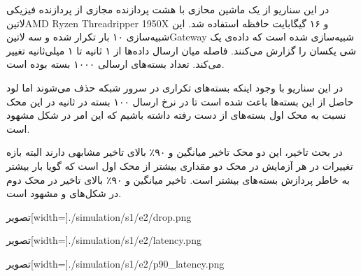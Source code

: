 در این سناریو از یک ماشین محازی با هشت پردازنده مجازی از پردازنده فیزیکی
‌لاتین{AMD Ryzen Threadripper 1950X}
و ۱۶ گیگابایت حافظه استفاده شد.
این شبیه‌سازی ۱۰ بار تکرار شده
و سه ‌لاتین{Gateway} شبیه‌سازی شده است که داده‌ی یک شی یکسان را گزارش می‌کنند. فاصله میان ارسال داده‌ها از ۱ ثانیه تا ۱ میلی‌ثانیه تغییر می‌کند.
تعداد بسته‌های ارسالی ۱۰۰۰ بسته بوده است.

در این سناریو با وجود اینکه بسته‌های تکراری در سرور شبکه حذف می‌شوند اما لود حاصل از این بسته‌ها باعث شده است تا در نرخ ارسال ۱۰۰ بسته در ثانیه
در این محک نسبت به محک اول بسته‌های از دست رفته داشته باشیم که این امر در شکل 
مشهود است.

در بحث تاخیر، این دو محک تاخیر میانگین و ۹۰٪ بالای تاخیر مشابهی دارند البته بازه تغییرات در هر آزمایش در محک دو مقداری بیشتر از محک اول است
که گویا بار بیشتر به خاطر پردازش بسته‌های بیشتر است. تاخیر میانگین و ۹۰٪ بالای تاخیر در محک دوم در شکل‌های 
و 
مشهود است.

‌تصویر[width=\textwidth]{./simulation/s1/e2/drop.png}

‌تصویر[width=\textwidth]{./simulation/s1/e2/latency.png}

‌تصویر[width=\textwidth]{./simulation/s1/e2/p90_latency.png}

